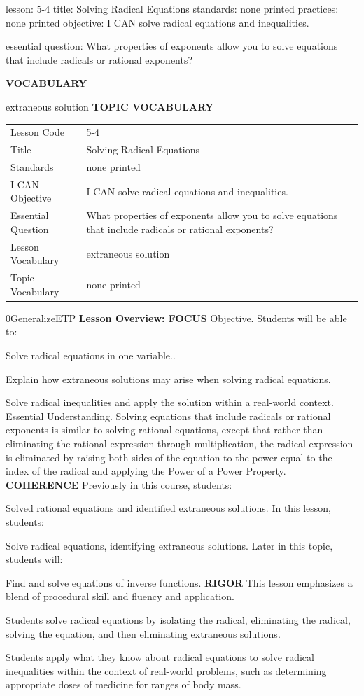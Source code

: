 \documentclass{article}
\newenvironment{lesson-meta}{}{}        %
\newenvironment{te-addendum}[2]{}{}     %
\newcommand{\te}[1]{}                   %
\begin{document}
\begin{lesson-meta}
lesson: 5-4
title: Solving Radical Equations
standards: none printed
practices: none printed
objective: I CAN solve radical equations and inequalities.

essential question: What properties of exponents allow you to solve equations that include radicals or rational exponents?

\textbf{VOCABULARY}
\item extraneous solution
\textbf{TOPIC VOCABULARY}
\te{No topic vocabulary list is printed on these lesson pages.}
\begin{tabular}{ll}
Lesson Code & 5-4 \\
Title & Solving Radical Equations \\
Standards & none printed \\
I CAN Objective & I CAN solve radical equations and inequalities. \\
Essential Question & What properties of exponents allow you to solve equations that include radicals or rational exponents? \\
Lesson Vocabulary & extraneous solution \\
Topic Vocabulary & none printed \\
\end{tabular}
\end{lesson-meta}
\begin{te-addendum}{0}{GeneralizeETP}
\textbf{Lesson Overview: FOCUS}
Objective. Students will be able to:
\item Solve radical equations in one variable..
\item Explain how extraneous solutions may arise when solving radical equations.
\item Solve radical inequalities and apply the solution within a real-world context.
Essential Understanding. Solving equations that include radicals or rational exponents is similar to solving rational equations, except that rather than eliminating the rational expression through multiplication, the radical expression is eliminated by raising both sides of the equation to the power equal to the index of the radical and applying the Power of a Power Property.
\textbf{COHERENCE}
Previously in this course, students:
\item Solved rational equations and identified extraneous solutions.
In this lesson, students:
\item Solve radical equations, identifying extraneous solutions.
Later in this topic, students will:
\item Find and solve equations of inverse functions.
\textbf{RIGOR}
This lesson emphasizes a blend of procedural skill and fluency and application.
\item Students solve radical equations by isolating the radical, eliminating the radical, solving the equation, and then eliminating extraneous solutions.
\item Students apply what they know about radical equations to solve radical inequalities within the context of real-world problems, such as determining appropriate doses of medicine for ranges of body mass.
\end{te-addendum}
\end{document}
